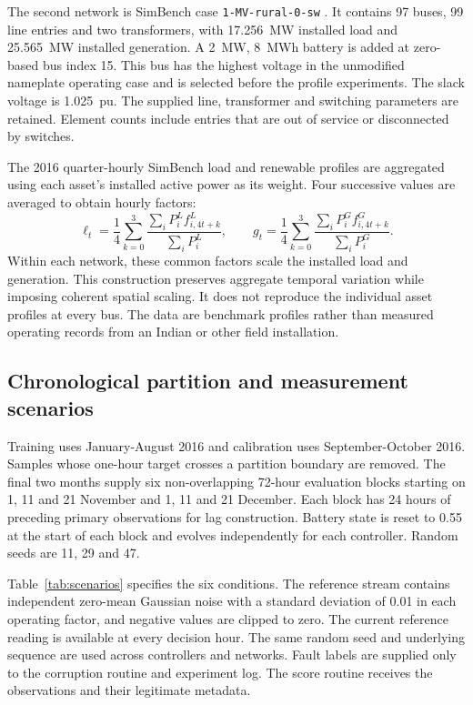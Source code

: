 \documentclass[11pt,a4paper]{article}
\begin{document}
The second network is SimBench case \texttt{1-MV-rural-0-sw} \cite{meinecke}. It contains 97 buses, 99 line entries and two transformers, with 17.256~MW installed load and 25.565~MW installed generation. A 2~MW, 8~MWh battery is added at zero-based bus index 15. This bus has the highest voltage in the unmodified nameplate operating case and is selected before the profile experiments. The slack voltage is 1.025~pu. The supplied line, transformer and switching parameters are retained. Element counts include entries that are out of service or disconnected by switches.

The 2016 quarter-hourly SimBench load and renewable profiles \cite{dataset} are aggregated using each asset's installed active power as its weight. Four successive values are averaged to obtain hourly factors:
\begin{equation}
\ell_t=\frac{1}{4}\sum_{k=0}^{3}\frac{\sum_i P_i^{L}f_{i,4t+k}^{L}}{\sum_i P_i^{L}},\qquad
g_t=\frac{1}{4}\sum_{k=0}^{3}\frac{\sum_i P_i^{G}f_{i,4t+k}^{G}}{\sum_i P_i^{G}}.\label{eq:profiles}
\end{equation}
Within each network, these common factors scale the installed load and generation. This construction preserves aggregate temporal variation while imposing coherent spatial scaling. It does not reproduce the individual asset profiles at every bus. The data are benchmark profiles rather than measured operating records from an Indian or other field installation.

\subsection{Chronological partition and measurement scenarios}
Training uses January-August 2016 and calibration uses September-October 2016. Samples whose one-hour target crosses a partition boundary are removed. The final two months supply six non-overlapping 72-hour evaluation blocks starting on 1, 11 and 21 November and 1, 11 and 21 December. Each block has 24 hours of preceding primary observations for lag construction. Battery state is reset to 0.55 at the start of each block and evolves independently for each controller. Random seeds are 11, 29 and 47.

Table~\ref{tab:scenarios} specifies the six conditions. The reference stream contains independent zero-mean Gaussian noise with a standard deviation of 0.01 in each operating factor, and negative values are clipped to zero. The current reference reading is available at every decision hour. The same random seed and underlying sequence are used across controllers and networks. Fault labels are supplied only to the corruption routine and experiment log. The score routine receives the observations and their legitimate metadata.
\end{document}
